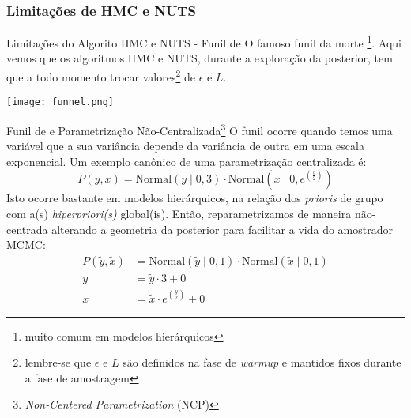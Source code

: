 \subsubsection{Limitações de HMC e NUTS}
\begin{frame}{Limitações do Algorito HMC e NUTS - Funil de \textcite{nealSliceSampling2003}}
  O famoso funil da morte \footnote{muito comum em modelos hierárquicos}.
  Aqui vemos que os algoritmos HMC e NUTS, durante a exploração da
  posterior, tem que a todo momento trocar valores\footnote{lembre-se que
  $\epsilon$ e $L$ são definidos na fase de \textit{warmup} e
  mantidos fixos durante a fase de amostragem} de $\epsilon$ e $L$.




  \centering
  \texttt{[image: funnel.png]}
\end{frame}

\begin{frame}{Funil de \textcite{nealSliceSampling2003} e Parametrização Não-Centralizada\footnote{\textit{Non-Centered Parametrization} (NCP)}}
  \small
  O funil ocorre quando temos uma variável que a sua variância depende da variância
  de outra em uma escala exponencial. Um exemplo canônico de uma parametrização
  centralizada é:
  $$
  P(y,x) = \text{Normal}(y \mid 0 ,3) \cdot
  \text{Normal}\left(x \mid 0, e^{\left(\frac{y}{2}\right)}\right)
  $$
  Isto ocorre bastante em modelos hierárquicos, na relação dos \textit{prioris} de grupo
  com a(s) \textit{hiperpriori(s)} global(is). Então, reparametrizamos de maneira
  não-centrada alterando a geometria da posterior para facilitar a vida do amostrador
  MCMC:
  $$
  \begin{aligned}
    P(\tilde{y},\tilde{x}) &= \text{Normal}(\tilde{y} \mid 0, 1) \cdot
  \text{Normal}(\tilde{x} \mid 0, 1) \\
    y &= \tilde{y} \cdot 3 + 0 \\
    x &= \tilde{x} \cdot  e^{\left(\frac{y}{2}\right)} + 0
  \end{aligned}
  $$
\end{frame}

